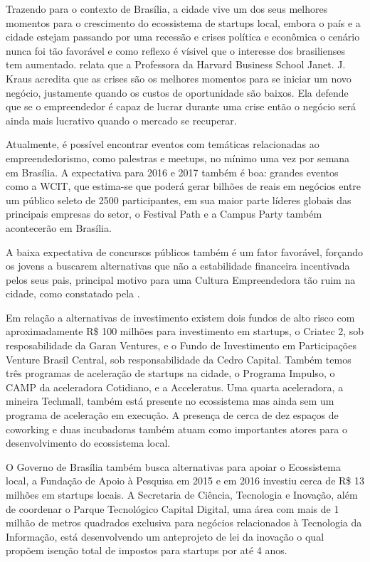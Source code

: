 Trazendo para o contexto de Brasília, a cidade vive um dos seus melhores momentos para o crescimento do ecossistema de startups local, embora o país e a cidade estejam passando por uma recessão e crises política e econômica o cenário nunca foi tão favorável e como reflexo é vísivel que o interesse dos brasilienses tem aumentado.  relata que a Professora da Harvard Business School Janet. J. Kraus acredita que as crises são os melhores momentos para se iniciar um novo negócio, justamente quando os custos de oportunidade são baixos. Ela defende que se o empreendedor é capaz de lucrar durante uma crise então o negócio será ainda mais lucrativo quando o mercado se recuperar.

Atualmente, é possível encontrar eventos com temáticas relacionadas ao empreendedorismo, como palestras e meetups, no mínimo uma vez por semana em Brasília. A expectativa para 2016 e 2017 também é boa: grandes eventos como a WCIT, que estima-se que poderá gerar bilhões de reais em negócios entre um público seleto de 2500 participantes, em sua maior parte líderes globais das principais empresas do setor, o Festival Path e a Campus Party também acontecerão em Brasília. 

A baixa expectativa de concursos públicos também é um fator favorável, forçando os jovens a buscarem alternativas que não a estabilidade financeira incentivada pelos seus pais, principal motivo para uma Cultura Empreendedora tão ruim na cidade, como constatado pela .

Em relação a alternativas de investimento existem dois fundos de alto risco com aproximadamente R\$ 100 milhões para investimento em startups, o Criatec 2, sob resposabilidade da Garan Ventures, e o Fundo de Investimento em Participações Venture Brasil Central, sob responsabilidade da Cedro Capital. Também temos três programas de aceleração de startups na cidade, o Programa Impulso, o CAMP da aceleradora Cotidiano, e a Acceleratus. Uma quarta aceleradora, a mineira Techmall, também está presente no ecossistema mas ainda sem um programa de aceleração em execução. A presença de cerca de dez espaços de coworking e duas incubadoras também atuam como importantes atores para o desenvolvimento do ecossistema local.

O Governo de Brasília também busca alternativas para apoiar o Ecossistema local, a Fundação de Apoio à Pesquisa em 2015 e em 2016 investiu cerca de R\$ 13 milhões em startups locais. A Secretaria de Ciência, Tecnologia e Inovação, além de coordenar o Parque Tecnológico Capital Digital, uma área com mais de 1 milhão de metros quadrados exclusiva para negócios relacionados à Tecnologia da Informação, está desenvolvendo um anteprojeto de lei da inovação o qual propõem isenção total de impostos para startups por até 4 anos. 

